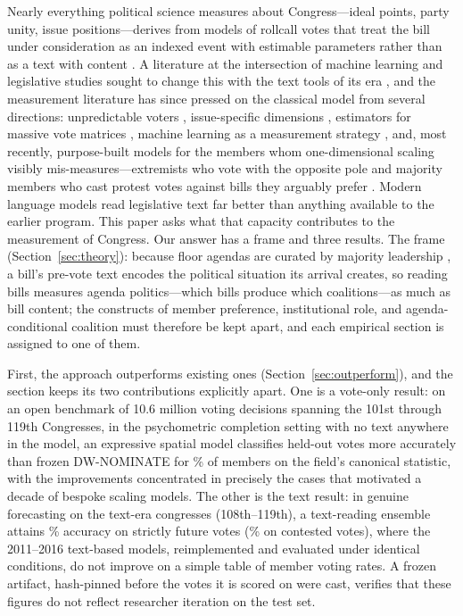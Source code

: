 \documentclass[12pt]{article}
\begin{document}
Nearly everything political science measures about Congress---ideal
points, party unity, issue positions---derives from models of
rollcall votes that treat the bill under consideration as an indexed
event with estimable parameters rather than as a text with content
\citep{poole1997congress, clinton2004statistical}. A literature at
the intersection of machine learning and legislative studies sought
to change this with the text tools of its era
\citep{gerrish2011predicting, kraft2016embedding}, and the
measurement literature has since pressed on the classical model from
several directions: unpredictable voters
\citep{lauderdale2010unpredictable}, issue-specific dimensions
\citep{lauderdale2014scaling, crespin2010dimensions}, estimators for
massive vote matrices \citep{imai2016fast}, machine learning as a
measurement strategy \citep{bonica2018inferring}, and, most recently,
purpose-built models for the members whom one-dimensional scaling
visibly mis-measures---extremists who vote with the opposite pole
\citep{duckmayr2023ends} and majority members who cast protest votes
against bills they arguably prefer \citep{fowler2026protest}. Modern
language models read legislative text far better than anything
available to the earlier program. This paper asks what that capacity
contributes to the measurement of Congress. Our answer has a frame
and three results. The frame (Section~\ref{sec:theory}): because
floor agendas are curated by majority leadership
\citep{cox2005setting}, a bill's pre-vote text encodes the political
situation its arrival creates, so reading bills measures agenda
politics---which bills produce which coalitions---as much as bill
content; the constructs of member preference, institutional role, and
agenda-conditional coalition must therefore be kept apart, and each
empirical section is assigned to one of them.

First, the approach outperforms existing ones
(Section~\ref{sec:outperform}), and the section keeps its two
contributions explicitly apart. One is a vote-only result: on an open
benchmark of 10.6 million voting decisions spanning the 101st through
119th Congresses, in the psychometric completion setting with no text
anywhere in the model, an expressive spatial model classifies
held-out votes more accurately than frozen DW-NOMINATE for
\memberCCshare\% of members on the field's canonical statistic, with
the improvements concentrated in precisely the cases that motivated a
decade of bespoke scaling models. The other is the text result: in genuine
forecasting on the text-era congresses (108th--119th), a text-reading
ensemble attains \champForecastAcc\% accuracy on strictly future
votes (\champContestedAcc\% on contested votes), where the
2011--2016 text-based models, reimplemented and evaluated under
identical conditions, do not improve on a simple table of member
voting rates. A frozen artifact, hash-pinned before the votes it is
scored on were cast, verifies that these figures do not reflect
researcher iteration on the test set.
\end{document}
